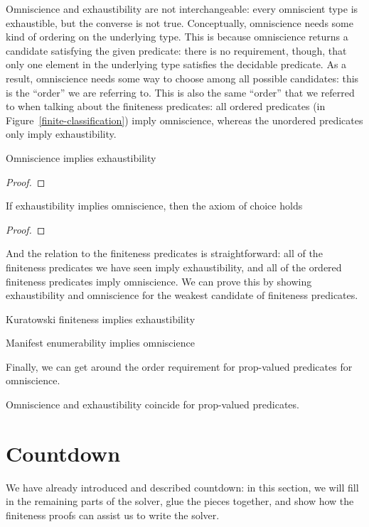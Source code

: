 Omniscience and exhaustibility are not interchangeable: every omniscient type is
exhaustible, but the converse is not true.
Conceptually, omniscience needs some kind of ordering on the underlying type.
This is because omniscience returns a candidate satisfying the given predicate:
there is no requirement, though, that only one element in the underlying type
satisfies the decidable predicate.
As a result, omniscience needs some way to choose among all possible candidates:
this is the ``order'' we are referring to.
This is also the same ``order'' that we referred to when talking about the
finiteness predicates: all ordered predicates (in
Figure~\ref{finite-classification}) imply omniscience, whereas the unordered
predicates only imply exhaustibility.
\begin{lemma}
  Omniscience implies exhaustibility
\end{lemma}
\begin{proof}
\end{proof}

\begin{lemma}
  If exhaustibility implies omniscience, then the axiom of choice holds
\end{lemma}
\begin{proof}
\end{proof}

And the relation to the finiteness predicates is straightforward: all of the
finiteness predicates we have seen imply exhaustibility, and all of the ordered
finiteness predicates imply omniscience.
We can prove this by showing exhaustibility and omniscience for the weakest
candidate of finiteness predicates.
\begin{lemma}
  Kuratowski finiteness implies exhaustibility
\end{lemma}
\begin{lemma}
  Manifest enumerability implies omniscience
\end{lemma}

Finally, we can get around the order requirement for prop-valued predicates for
omniscience.
\begin{lemma}
  Omniscience and exhaustibility coincide for prop-valued predicates.
\end{lemma}
\section{Countdown}
We have already introduced and described countdown: in this section, we will
fill in the remaining parts of the solver, glue the pieces together, and show
how the finiteness proofs can assist us to write the solver.
